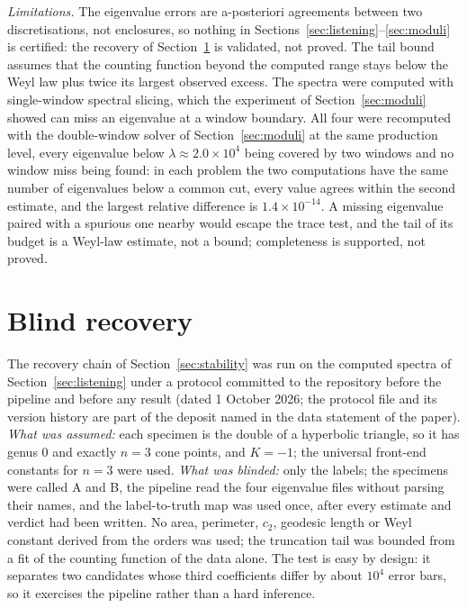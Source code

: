 \documentclass[pdflatex,sn-mathphys-num]{sn-jnl}
\theoremstyle{thmstyleone}%
\theoremstyle{thmstylethree}%
\begin{document}
\emph{Limitations.} The eigenvalue errors are a-posteriori agreements between two discretisations, not enclosures, so nothing in Sections~\ref{sec:listening}--\ref{sec:moduli} is certified: the recovery of Section~\ref{sec:blind} is validated, not proved. The tail bound assumes that the counting function beyond the computed range stays below the Weyl law plus twice its largest observed excess. The spectra were computed with single-window spectral slicing, which the experiment of Section~\ref{sec:moduli} showed can miss an eigenvalue at a window boundary. All four were recomputed with the double-window solver of Section~\ref{sec:moduli} at the same production level, every eigenvalue below $\lambda\approx2.0\times10^4$ being covered by two windows and no window miss being found: in each problem the two computations have the same number of eigenvalues below a common cut, every value agrees within the second estimate, and the largest relative difference is $1.4\times10^{-14}$. A missing eigenvalue paired with a spurious one nearby would escape the trace test, and the tail of its budget is a Weyl-law estimate, not a bound; completeness is supported, not proved.

\section{Blind recovery}\label{sec:blind}

The recovery chain of Section~\ref{sec:stability} was run on the computed spectra of Section~\ref{sec:listening} under a protocol committed to the repository before the pipeline and before any result (dated 1 October 2026; the protocol file and its version history are part of the deposit named in the data statement of the paper). \emph{What was assumed:} each specimen is the double of a hyperbolic triangle, so it has genus $0$ and exactly $n=3$ cone points, and $K=-1$; the universal front-end constants for $n=3$ were used. \emph{What was blinded:} only the labels; the specimens were called A and B, the pipeline read the four eigenvalue files without parsing their names, and the label-to-truth map was used once, after every estimate and verdict had been written. No area, perimeter, $c_2$, geodesic length or Weyl constant derived from the orders was used; the truncation tail was bounded from a fit of the counting function of the data alone. The test is easy by design: it separates two candidates whose third coefficients differ by about $10^4$ error bars, so it exercises the pipeline rather than a hard inference.
\end{document}
